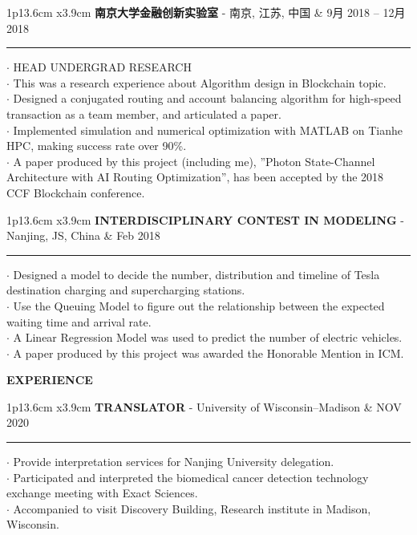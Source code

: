 \documentclass[UTF8,A4]{ctexart}
\newcommand{\cvsection}[1]
{
	\begin{center}
		\large\textcolor{sectcol}{\textbf{#1}}
	\end{center}
}
\newcommand{\cvevent}[3]
{

\begin{tabular*}{1\textwidth}{p{13.6cm}  x{3.9cm}}
	\textbf{#2} - \textcolor{bgcol}{#3} &   \vspace{2.5pt}\textcolor{sectcol}{#1}
\end{tabular*}

\vspace{-8pt}
\textcolor{softcol}{\hrule}
\vspace{6pt}


}
\begin{document}
\cvevent{9月 2018 – 12月 2018}
        {南京大学金融创新实验室}
        {南京, 江苏, 中国}

        $\cdot$ HEAD UNDERGRAD RESEARCH\\
        $\cdot$ This was a research experience about Algorithm design in Blockchain topic.\\
        $\cdot$ Designed a conjugated routing and account balancing algorithm for
                high-speed transaction as a team member, and articulated a paper.\\
        $\cdot$ Implemented simulation and numerical optimization with MATLAB on Tianhe HPC, 
                making success rate over 90\%.\\
        $\cdot$ A paper produced by this project (including me), 
                ”Photon State-Channel Architecture with AI Routing Optimization”, 
                has been accepted by the 2018 CCF Blockchain conference.\\

\cvevent{Feb 2018}
        {INTERDISCIPLINARY CONTEST IN MODELING}
        {Nanjing, JS, China}

        $\cdot$ Designed a model to decide the number,
                distribution and timeline of Tesla destination charging 
                and supercharging stations.\\
        $\cdot$ Use the Queuing Model to figure out the relationship between 
                the expected waiting time and arrival rate.\\
        $\cdot$ A Linear Regression Model was used to predict the number of electric vehicles.\\
        $\cdot$ A paper produced by this project was awarded the Honorable Mention in ICM.\\



\cvsection{EXPERIENCE}
\cvevent{NOV 2020}
        {TRANSLATOR}
        {University of Wisconsin–Madison}

        $\cdot$ Provide interpretation services for Nanjing University delegation.\\
        $\cdot$ Participated and interpreted the biomedical cancer detection 
                technology exchange meeting with Exact Sciences.\\
        $\cdot$ Accompanied to visit Discovery Building, Research institute in Madison, Wisconsin.\\
\end{document}
